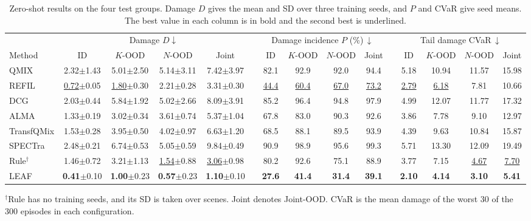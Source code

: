 \begin{table}[!t]
\centering
\footnotesize
\setlength{\tabcolsep}{3.4pt}
\caption{Zero-shot results on the four test groups. Damage $D$ gives the mean and SD over three training seeds, and $P$ and CVaR give seed means. The best value in each column is in bold and the second best is underlined.}
\label{tab:exp-main}
\begin{tabular}{@{}l cccc c cccc c cccc@{}}
\toprule
& \multicolumn{4}{c}{Damage $D\downarrow$} && \multicolumn{4}{c}{Damage incidence $P$ (\%)\,$\downarrow$} && \multicolumn{4}{c}{Tail damage CVaR\,$\downarrow$}\\
\cmidrule{2-5}\cmidrule{7-10}\cmidrule{12-15}
Method & ID & $K$-OOD & $N$-OOD & Joint && ID & $K$-OOD & $N$-OOD & Joint && ID & $K$-OOD & $N$-OOD & Joint\\
\midrule
QMIX & 2.32$\pm$1.43 & 5.01$\pm$2.50 & 5.14$\pm$3.11 & 7.42$\pm$3.97 && 82.1 & 92.9 & 92.0 & 94.4 && 5.18 & 10.94 & 11.57 & 15.98\\
REFIL & \underline{0.72}$\pm$0.05 & \underline{1.80}$\pm$0.30 & 2.21$\pm$0.28 & 3.31$\pm$0.30 && \underline{44.4} & \underline{60.4} & \underline{67.0} & \underline{73.2} && \underline{2.79} & \underline{6.18} & 7.81 & 10.66\\
DCG & 2.03$\pm$0.44 & 5.84$\pm$1.92 & 5.02$\pm$2.66 & 8.09$\pm$3.91 && 85.2 & 96.4 & 94.8 & 97.9 && 4.99 & 12.07 & 11.77 & 17.32\\
ALMA & 1.33$\pm$0.19 & 3.02$\pm$0.34 & 3.61$\pm$0.74 & 5.37$\pm$1.04 && 67.8 & 83.0 & 90.3 & 92.6 && 3.86 & 7.78 & 9.10 & 12.97\\
TransfQMix & 1.53$\pm$0.28 & 3.95$\pm$0.50 & 4.02$\pm$0.97 & 6.63$\pm$1.20 && 68.5 & 88.1 & 89.5 & 93.9 && 4.39 & 9.63 & 10.84 & 15.87\\
SPECTra & 2.48$\pm$0.21 & 6.74$\pm$0.53 & 5.05$\pm$0.59 & 9.84$\pm$0.49 && 90.9 & 98.9 & 95.6 & 99.3 && 5.71 & 13.30 & 12.09 & 19.49\\
Rule$^\dagger$ & 1.46$\pm$0.72 & 3.21$\pm$1.13 & \underline{1.54}$\pm$0.88 & \underline{3.06}$\pm$0.98 && 80.2 & 92.6 & 75.1 & 88.9 && 3.77 & 7.15 & \underline{4.67} & \underline{7.70}\\
LEAF & \textbf{0.41}$\pm$0.10 & \textbf{1.00}$\pm$0.23 & \textbf{0.57}$\pm$0.23 & \textbf{1.10}$\pm$0.10 && \textbf{27.6} & \textbf{41.4} & \textbf{31.4} & \textbf{39.1} && \textbf{2.10} & \textbf{4.14} & \textbf{3.10} & \textbf{5.41}\\
\bottomrule
\end{tabular}
\vspace{2pt}

\parbox{\textwidth}{\footnotesize $^\dagger$Rule has no training seeds, and its SD is taken over scenes. Joint denotes Joint-OOD. CVaR is the mean damage of the worst 30 of the 300 episodes in each configuration.}
\end{table}


